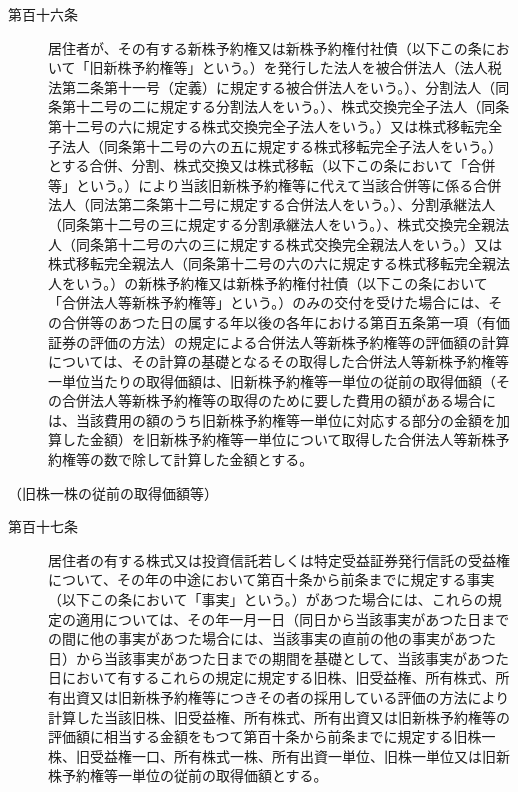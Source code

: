 \documentclass[twocolumn,a4j,10pt]{ltjtarticle}
\begin{document}
\begin{description}
\item[第百十六条]居住者が、その有する新株予約権又は新株予約権付社債（以下この条において「旧新株予約権等」という。）を発行した法人を被合併法人（法人税法第二条第十一号（定義）に規定する被合併法人をいう。）、分割法人（同条第十二号の二に規定する分割法人をいう。）、株式交換完全子法人（同条第十二号の六に規定する株式交換完全子法人をいう。）又は株式移転完全子法人（同条第十二号の六の五に規定する株式移転完全子法人をいう。）とする合併、分割、株式交換又は株式移転（以下この条において「合併等」という。）により当該旧新株予約権等に代えて当該合併等に係る合併法人（同法第二条第十二号に規定する合併法人をいう。）、分割承継法人（同条第十二号の三に規定する分割承継法人をいう。）、株式交換完全親法人（同条第十二号の六の三に規定する株式交換完全親法人をいう。）又は株式移転完全親法人（同条第十二号の六の六に規定する株式移転完全親法人をいう。）の新株予約権又は新株予約権付社債（以下この条において「合併法人等新株予約権等」という。）のみの交付を受けた場合には、その合併等のあつた日の属する年以後の各年における第百五条第一項（有価証券の評価の方法）の規定による合併法人等新株予約権等の評価額の計算については、その計算の基礎となるその取得した合併法人等新株予約権等一単位当たりの取得価額は、旧新株予約権等一単位の従前の取得価額（その合併法人等新株予約権等の取得のために要した費用の額がある場合には、当該費用の額のうち旧新株予約権等一単位に対応する部分の金額を加算した金額）を旧新株予約権等一単位について取得した合併法人等新株予約権等の数で除して計算した金額とする。
\end{description}
\noindent\hspace{10pt}（旧株一株の従前の取得価額等）
\begin{description}
\item[第百十七条]居住者の有する株式又は投資信託若しくは特定受益証券発行信託の受益権について、その年の中途において第百十条から前条までに規定する事実（以下この条において「事実」という。）があつた場合には、これらの規定の適用については、その年一月一日（同日から当該事実があつた日までの間に他の事実があつた場合には、当該事実の直前の他の事実があつた日）から当該事実があつた日までの期間を基礎として、当該事実があつた日において有するこれらの規定に規定する旧株、旧受益権、所有株式、所有出資又は旧新株予約権等につきその者の採用している評価の方法により計算した当該旧株、旧受益権、所有株式、所有出資又は旧新株予約権等の評価額に相当する金額をもつて第百十条から前条までに規定する旧株一株、旧受益権一口、所有株式一株、所有出資一単位、旧株一単位又は旧新株予約権等一単位の従前の取得価額とする。
\end{description}
\end{document}
